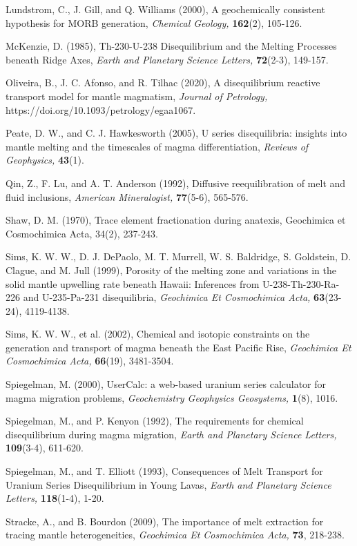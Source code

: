 \documentclass[11pt]{article}
\begin{document}
Lundstrom, C., J. Gill, and Q. Williams (2000), A geochemically
consistent hypothesis for MORB generation, \emph{Chemical Geology,}
\textbf{162}(2), 105-126.

McKenzie, D. (1985), Th-230-U-238 Disequilibrium and the Melting
Processes beneath Ridge Axes, \emph{Earth and Planetary Science
Letters,} \textbf{72}(2-3), 149-157.

Oliveira, B., J. C. Afonso, and R. Tilhac (2020), A disequilibrium
reactive transport model for mantle magmatism, \emph{Journal of
Petrology,} https://doi.org/10.1093/petrology/egaa1067.

Peate, D. W., and C. J. Hawkesworth (2005), U series disequilibria:
insights into mantle melting and the timescales of magma
differentiation, \emph{Reviews of Geophysics,} \textbf{43}(1).

Qin, Z., F. Lu, and A. T. Anderson (1992), Diffusive reequilibration of
melt and fluid inclusions, \emph{American Mineralogist,}
\textbf{77}(5-6), 565-576.

Shaw, D. M. (1970), Trace element fractionation during anatexis,
Geochimica et Cosmochimica Acta, 34(2), 237-243.

Sims, K. W. W., D. J. DePaolo, M. T. Murrell, W. S. Baldridge, S.
Goldstein, D. Clague, and M. Jull (1999), Porosity of the melting zone
and variations in the solid mantle upwelling rate beneath Hawaii:
Inferences from U-238-Th-230-Ra-226 and U-235-Pa-231 disequilibria,
\emph{Geochimica Et Cosmochimica Acta,} \textbf{63}(23-24), 4119-4138.

Sims, K. W. W., et al. (2002), Chemical and isotopic constraints on the
generation and transport of magma beneath the East Pacific Rise,
\emph{Geochimica Et Cosmochimica Acta,} \textbf{66}(19), 3481-3504.

Spiegelman, M. (2000), UserCalc: a web-based uranium series calculator
for magma migration problems, \emph{Geochemistry Geophysics Geosystems,}
\textbf{1}(8), 1016.

Spiegelman, M., and P. Kenyon (1992), The requirements for chemical
disequilibrium during magma migration, \emph{Earth and Planetary Science
Letters,} \textbf{109}(3-4), 611-620.

Spiegelman, M., and T. Elliott (1993), Consequences of Melt Transport
for Uranium Series Disequilibrium in Young Lavas, \emph{Earth and
Planetary Science Letters,} \textbf{118}(1-4), 1-20.

Stracke, A., and B. Bourdon (2009), The importance of melt extraction
for tracing mantle heterogeneities, \emph{Geochimica Et Cosmochimica
Acta,} \textbf{73}, 218-238.
\end{document}
